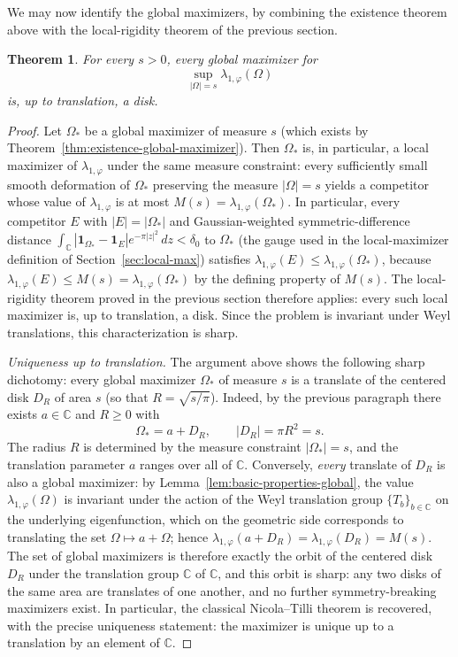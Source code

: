 \documentclass[a4paper,11pt,reqno]{amsart}
\numberwithin{equation}{section}
\theoremstyle{plain} %
\newtheorem{theorem}{Theorem}
\theoremstyle{definition} %
\theoremstyle{remark}
\newcommand{\C}{\mathbb{C}}
\begin{document}
We may now identify the global maximizers, by combining the existence theorem
above with the local-rigidity theorem of the previous section.

\begin{theorem}\label{thm:global-maximizers-are-disks}
For every \(s>0\), every global maximizer for
\[
\sup_{|\Omega|=s}\lambda_{1,\varphi}(\Omega)
\]
is, up to translation, a disk.
\end{theorem}

\begin{proof}
Let \(\Omega_*\) be a global maximizer of measure \(s\) (which exists by
Theorem~\ref{thm:existence-global-maximizer}). Then \(\Omega_*\) is, in
particular, a local maximizer of \(\lambda_{1,\varphi}\) under the same
measure constraint: every sufficiently small smooth deformation of
\(\Omega_*\) preserving the measure \(|\Omega|=s\) yields a competitor
whose value of \(\lambda_{1,\varphi}\) is at most
\(M(s)=\lambda_{1,\varphi}(\Omega_*)\). In particular, every competitor
\(E\) with \(|E|=|\Omega_*|\) and Gaussian-weighted symmetric-difference
distance \(\int_\C |\mathbf 1_{\Omega_*}-\mathbf 1_E|e^{-\pi|z|^2}\,dz<\delta_0\)
to \(\Omega_*\) (the gauge used in the local-maximizer definition of
Section~\ref{sec:local-max}) satisfies
\(\lambda_{1,\varphi}(E)\le \lambda_{1,\varphi}(\Omega_*)\), because
\(\lambda_{1,\varphi}(E)\le M(s)=\lambda_{1,\varphi}(\Omega_*)\) by the
defining property of \(M(s)\). The local-rigidity theorem proved in
the previous section therefore applies: every such local maximizer is, up
to translation, a disk. Since the problem is invariant under Weyl
translations, this characterization is sharp.

\medskip
\noindent
\emph{Uniqueness up to translation.} The argument above shows the
following sharp dichotomy: every global maximizer \(\Omega_*\) of measure
\(s\) is a translate of the centered disk \(D_R\) of area \(s\) (so that
\(R=\sqrt{s/\pi}\)). Indeed, by the previous paragraph there exists
\(a\in \C\) and \(R\ge 0\) with
\[
\Omega_*=a+D_R,
\qquad
|D_R|=\pi R^2=s.
\]
The radius \(R\) is determined by the measure constraint \(|\Omega_*|=s\),
and the translation parameter \(a\) ranges over all of \(\C\). Conversely,
\emph{every} translate of \(D_R\) is also a global maximizer: by
Lemma~\ref{lem:basic-properties-global}, the value
\(\lambda_{1,\varphi}(\Omega)\) is invariant under the action of the Weyl
translation group \(\{T_b\}_{b\in\C}\) on the underlying eigenfunction,
which on the geometric side corresponds to translating the set
\(\Omega\mapsto a+\Omega\); hence
\(\lambda_{1,\varphi}(a+D_R)=\lambda_{1,\varphi}(D_R)=M(s)\). The set of
global maximizers is therefore exactly the orbit of the centered disk
\(D_R\) under the translation group \(\C\) of \(\C\), and this orbit is
sharp: any two disks of the same area are translates of one another, and
no further symmetry-breaking maximizers exist. In particular, the
classical Nicola--Tilli theorem \cite{Nicola-Tilli,Nicola-Tilli-2} is
recovered, with the precise uniqueness statement: the maximizer is
unique up to a translation by an element of \(\C\).
\end{proof}
\end{document}
